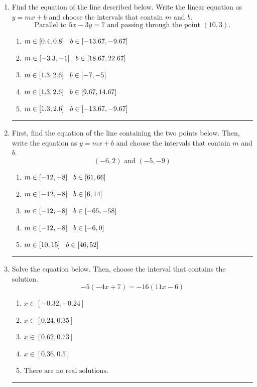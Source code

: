 \documentclass[14pt]{extbook}
\newcommand{\litem}[1]{\item#1\hspace*{-1cm}\rule{\textwidth}{0.4pt}}
\begin{document}
\begin{enumerate}
\litem{
Find the equation of the line described below. Write the linear equation as $ y=mx+b $ and choose the intervals that contain $m$ and $b$.\[ \text{Parallel to } 5 x - 3 y = 7 \text{ and passing through the point } (10, 3). \]\begin{enumerate}[label=\Alph*.]
\item \( m \in [0.4, 0.8] \hspace*{3mm} b \in [-13.67, -9.67] \)
\item \( m \in [-3.3, -1] \hspace*{3mm} b \in [18.67, 22.67] \)
\item \( m \in [1.3, 2.6] \hspace*{3mm} b \in [-7, -5] \)
\item \( m \in [1.3, 2.6] \hspace*{3mm} b \in [9.67, 14.67] \)
\item \( m \in [1.3, 2.6] \hspace*{3mm} b \in [-13.67, -9.67] \)

\end{enumerate} }
\litem{
First, find the equation of the line containing the two points below. Then, write the equation as $ y=mx+b $ and choose the intervals that contain $m$ and $b$.\[ (-6, 2) \text{ and } (-5, -9) \]\begin{enumerate}[label=\Alph*.]
\item \( m \in [-12, -8] \hspace*{3mm} b \in [61, 66] \)
\item \( m \in [-12, -8] \hspace*{3mm} b \in [6, 14] \)
\item \( m \in [-12, -8] \hspace*{3mm} b \in [-65, -58] \)
\item \( m \in [-12, -8] \hspace*{3mm} b \in [-6, 0] \)
\item \( m \in [10, 15] \hspace*{3mm} b \in [46, 52] \)

\end{enumerate} }
\litem{
Solve the equation below. Then, choose the interval that contains the solution.\[ -5(-4x + 7) = -16(11x -6) \]\begin{enumerate}[label=\Alph*.]
\item \( x \in [-0.32, -0.24] \)
\item \( x \in [0.24, 0.35] \)
\item \( x \in [0.62, 0.73] \)
\item \( x \in [0.36, 0.5] \)
\item \( \text{There are no real solutions.} \)


\end{enumerate}}
\end{enumerate}
\end{document}
